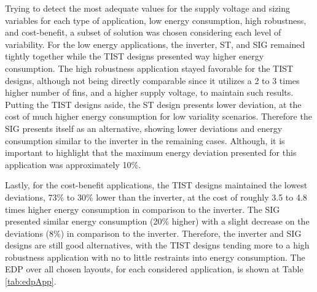 \documentclass[pgmicro,mestrado,english]{iiufrgs}
\begin{document}
Trying to detect the most adequate values for the supply voltage and sizing variables for each type of application, low energy consumption, high robustness, and cost-benefit, a subset of solution was chosen considering each level of variability. For the low energy applications, the inverter, ST, and SIG remained tightly together while the TIST designs presented way higher energy consumption. The high robustness application stayed favorable for the TIST designs, although not being directly comparable since it utilizes a 2 to 3 times higher number of fins, and a higher supply voltage, to maintain such results. Putting the TIST designs aside, the ST design presents lower deviation, at the cost of much higher energy consumption for low variality scenarios. Therefore the SIG presents itself as an alternative, showing lower deviations and energy consumption similar to the inverter in the remaining cases. Although, it is important to highlight that the maximum energy deviation presented for this application was approximately 10\%.

Lastly, for the cost-benefit applications, the TIST designs maintained the lowest deviations, 73\% to 30\% lower than the inverter, at the cost of roughly 3.5 to 4.8 times higher energy consumption in comparison to the inverter. The SIG presented similar energy consumption (20\% higher) with a slight decrease on the deviations (8\%) in comparison to the inverter. Therefore, the inverter and SIG designs are still good alternatives, with the TIST designs tending more to a high robustness application with no to little restraints into energy consumption. The EDP over all chosen layouts, for each considered application, is shown at Table \ref{tab:edpApp}.

\begin{table}[]
\centering
\caption{EDP for each chosen design at each considered application.}
\label{tab:edpApp}
\end{table}
\end{document}
